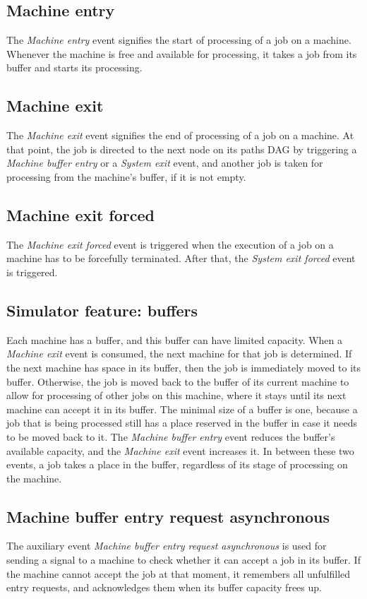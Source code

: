 \subsection{Machine entry}
The \textit{Machine entry} event signifies the start of processing of a job on a machine. Whenever the machine is free and available for processing, it takes a job from its buffer and starts its processing.

\subsection{Machine exit}
The \textit{Machine exit} event signifies the end of processing of a job on a machine. At that point, the job is directed to the next node on its paths DAG by triggering a \textit{Machine buffer entry} or a \textit{System exit} event, and another job is taken for processing from the machine's buffer, if it is not empty.

\subsection{Machine exit forced}
The \textit{Machine exit forced} event is triggered when the execution of a job on a machine has to be forcefully terminated. After that, the \textit{System exit forced} event is triggered.

\subsection{Simulator feature: buffers}
Each machine has a buffer, and this buffer can have limited capacity. When a \textit{Machine exit} event is consumed, the next machine for that job is determined. If the next machine has space in its buffer, then the job is immediately moved to its buffer. Otherwise, the job is moved back to the buffer of its current machine to allow for processing of other jobs on this machine, where it stays until its next machine can accept it in its buffer. The minimal size of a buffer is one, because a job that is being processed still has a place reserved in the buffer in case it needs to be moved back to it. The \textit{Machine buffer entry} event reduces the buffer's available capacity, and the \textit{Machine exit} event increases it. In between these two events, a job takes a place in the buffer, regardless of its stage of processing on the machine. 

\subsection{Machine buffer entry request asynchronous}
The auxiliary event \textit{Machine buffer entry request asynchronous} is used for sending a signal to a machine to check whether it can accept a job in its buffer. If the machine cannot accept the job at that moment, it remembers all unfulfilled entry requests, and acknowledges them when its buffer capacity frees up.

